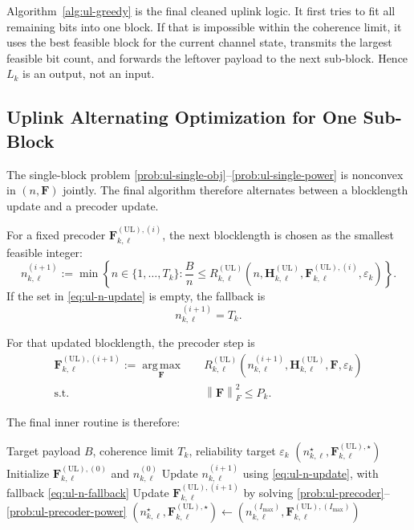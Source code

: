 \documentclass[11pt]{article}
\newcommand{\F}{\mathbf{F}}
\newcommand{\Hc}{\mathbf{H}}
\newcommand{\argmax}{\operatorname*{arg\,max}}
\newcommand{\norm}[1]{\left\lVert #1 \right\rVert}
\newcommand{\UL}{\mathrm{UL}}
\begin{document}
Algorithm~\ref{alg:ul-greedy} is the final cleaned uplink logic. It first tries to fit all remaining bits into one block. If that is impossible within the coherence limit, it uses the best feasible block for the current channel state, transmits the largest feasible bit count, and forwards the leftover payload to the next sub-block. Hence $L_k$ is an output, not an input.

\subsection{Uplink Alternating Optimization for One Sub-Block}
The single-block problem \eqref{prob:ul-single-obj}--\eqref{prob:ul-single-power} is nonconvex in $(n,\F)$ jointly. The final algorithm therefore alternates between a blocklength update and a precoder update.

For a fixed precoder $\F_{k,\ell}^{(\UL),(i)}$, the next blocklength is chosen as the smallest feasible integer:
\begin{equation}
n_{k,\ell}^{(i+1)}
:=
\min \left\{
n \in \{1,\dots,T_k\}
:
\frac{B}{n}
\le
R_{k,\ell}^{(\UL)}(n,\Hc_{k,\ell}^{(\UL)},\F_{k,\ell}^{(\UL),(i)},\varepsilon_k)
\right\}.
\label{eq:ul-n-update}
\end{equation}
If the set in \eqref{eq:ul-n-update} is empty, the fallback is
\begin{equation}
n_{k,\ell}^{(i+1)} = T_k.
\label{eq:ul-n-fallback}
\end{equation}

For that updated blocklength, the precoder step is
\begin{subequations}
\begin{align}
\F_{k,\ell}^{(\UL),(i+1)}
:=
\argmax_{\F}\quad
&
R_{k,\ell}^{(\UL)}(n_{k,\ell}^{(i+1)},\Hc_{k,\ell}^{(\UL)},\F,\varepsilon_k)
\label{prob:ul-precoder}
\\
\text{s.t.}\quad
&
\norm{\F}_F^2 \le P_k.
\label{prob:ul-precoder-power}
\end{align}
\end{subequations}

The final inner routine is therefore:

\begin{algorithm}[ht]
\caption{Alternating Optimization for $\mathrm{AO}_k^{(\UL)}(B,T_k,\varepsilon_k)$}
\label{alg:ul-ao}
\begin{algorithmic}[1]
\Require Target payload $B$, coherence limit $T_k$, reliability target $\varepsilon_k$
\Ensure $(n_{k,\ell}^\star,\F_{k,\ell}^{(\UL),\star})$
\State Initialize $\F_{k,\ell}^{(\UL),(0)}$ and $n_{k,\ell}^{(0)}$
    \State Update $n_{k,\ell}^{(i+1)}$ using \eqref{eq:ul-n-update}, with fallback \eqref{eq:ul-n-fallback}
    \State Update $\F_{k,\ell}^{(\UL),(i+1)}$ by solving \eqref{prob:ul-precoder}--\eqref{prob:ul-precoder-power}
\EndFor
\State $(n_{k,\ell}^\star,\F_{k,\ell}^{(\UL),\star}) \gets (n_{k,\ell}^{(I_{\max})},\F_{k,\ell}^{(\UL),(I_{\max})})$
\end{algorithmic}
\end{algorithm}
\end{document}
